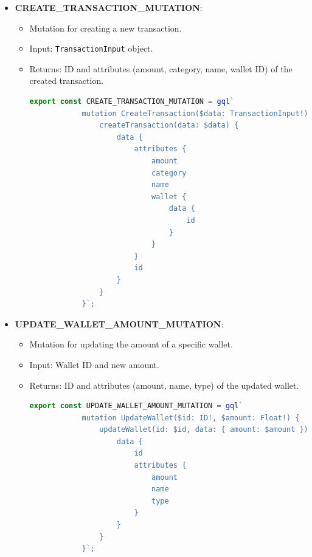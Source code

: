 \begin{itemize}
    \item \textbf{CREATE\_TRANSACTION\_MUTATION}:
    \begin{itemize}
        \item Mutation for creating a new transaction.
        \item Input: \texttt{TransactionInput} object.
        \item Returns: ID and attributes (amount, category, name, wallet ID) of the created transaction.
        \begin{lstlisting}[language=TypeScript]
        export const CREATE_TRANSACTION_MUTATION = gql`
            mutation CreateTransaction($data: TransactionInput!) {
                createTransaction(data: $data) {
                    data {
                        attributes {
                            amount
                            category
                            name
                            wallet {
                                data {
                                    id
                                }
                            }
                        }
                        id
                    }
                }
            }`;
        \end{lstlisting}
    \end{itemize}
    
    \item \textbf{UPDATE\_WALLET\_AMOUNT\_MUTATION}:
    \begin{itemize}
        \item Mutation for updating the amount of a specific wallet.
        \item Input: Wallet ID and new amount.
        \item Returns: ID and attributes (amount, name, type) of the updated wallet.
        \begin{lstlisting}[language=TypeScript]
        export const UPDATE_WALLET_AMOUNT_MUTATION = gql`
            mutation UpdateWallet($id: ID!, $amount: Float!) {
                updateWallet(id: $id, data: { amount: $amount }) {
                    data {
                        id
                        attributes {
                            amount
                            name
                            type
                        }
                    }
                }
            }`;
        \end{lstlisting}
            \end{itemize}
    

\end{itemize}
